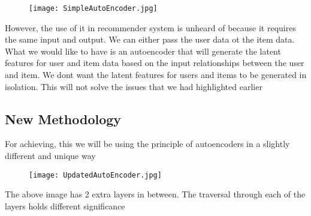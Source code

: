 \documentclass[letterpaper,twocolumn,10pt]{article}
\begin{document}
\begin{figure}[h!]
\texttt{[image: SimpleAutoEncoder.jpg]}
\end{figure}

However, the use of it in recommender system is unheard of because it requires the same input and output. We can either pass the user data ot the item data. What we would like to have is an autoencoder that will generate the latent features for user and item data based on the input relationships between the user and item. We dont want the latent features for users and items to be generated in isolation. This will not solve the issues that we had highlighted earlier

\subsection{New Methodology}
For achieving, this we will be using the principle of autoencoders in a slightly different and unique way

\begin{figure}[h!]
\texttt{[image: UpdatedAutoEncoder.jpg]}
\end{figure}

The above image has 2 extra layers in between. The traversal through each of the layers holds different significance
\end{document}
